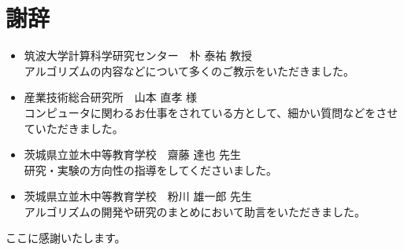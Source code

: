 \section{謝辞}
\begin{itemize}
	\item 筑波大学計算科学研究センター　朴 泰祐 教授	\\
		アルゴリズムの内容などについて多くのご教示をいただきました。 

	\item 産業技術総合研究所　山本 直孝 様	\\
		コンピュータに関わるお仕事をされている方として、細かい質問などをさせていただきました。

	\item 茨城県立並木中等教育学校　齋藤 達也 先生	\\
		研究・実験の方向性の指導をしてくださいました。

	\item 茨城県立並木中等教育学校　粉川 雄一郎 先生	\\
		アルゴリズムの開発や研究のまとめにおいて助言をいただきました。
\end{itemize}
ここに感謝いたします。
